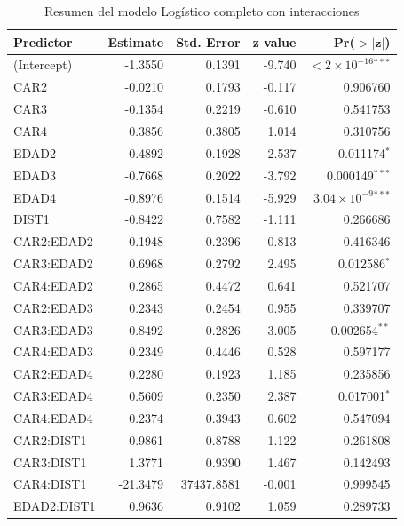 \begin{table}[H]
\centering
\caption{Resumen del modelo Logístico completo con interacciones}
\label{tab:modelo_completo}
\footnotesize %
\begin{tabular}{lrrrr}
\toprule
\textbf{Predictor} & \textbf{Estimate} & \textbf{Std. Error} & \textbf{z value} & \textbf{Pr($\mathbf{>|z|}$)} \\
\midrule
(Intercept)        & -1.3550 & 0.1391 & -9.740 & $<2 \times 10^{-16}$$^{***}$ \\
CAR2               & -0.0210 & 0.1793 & -0.117 & 0.906760 \\
CAR3               & -0.1354 & 0.2219 & -0.610 & 0.541753 \\
CAR4               & 0.3856  & 0.3805 & 1.014  & 0.310756 \\
EDAD2              & -0.4892 & 0.1928 & -2.537 & 0.011174$^{*}$ \\
EDAD3              & -0.7668 & 0.2022 & -3.792 & 0.000149$^{***}$ \\
EDAD4              & -0.8976 & 0.1514 & -5.929 & $3.04 \times 10^{-9}$$^{***}$ \\
DIST1              & -0.8422 & 0.7582 & -1.111 & 0.266686 \\
CAR2:EDAD2         & 0.1948  & 0.2396 & 0.813  & 0.416346 \\
CAR3:EDAD2         & 0.6968  & 0.2792 & 2.495  & 0.012586$^{*}$ \\
CAR4:EDAD2         & 0.2865  & 0.4472 & 0.641  & 0.521707 \\
CAR2:EDAD3         & 0.2343  & 0.2454 & 0.955  & 0.339707 \\
CAR3:EDAD3         & 0.8492  & 0.2826 & 3.005  & 0.002654$^{**}$ \\
CAR4:EDAD3         & 0.2349  & 0.4446 & 0.528  & 0.597177 \\
CAR2:EDAD4         & 0.2280  & 0.1923 & 1.185  & 0.235856 \\
CAR3:EDAD4         & 0.5609  & 0.2350 & 2.387  & 0.017001$^{*}$ \\
CAR4:EDAD4         & 0.2374  & 0.3943 & 0.602  & 0.547094 \\
CAR2:DIST1         & 0.9861  & 0.8788 & 1.122  & 0.261808 \\
CAR3:DIST1         & 1.3771  & 0.9390 & 1.467  & 0.142493 \\
CAR4:DIST1         & -21.3479& 37437.8581& -0.001 & 0.999545 \\
EDAD2:DIST1        & 0.9636  & 0.9102 & 1.059  & 0.289733 \\

\end{tabular}
\end{table}
